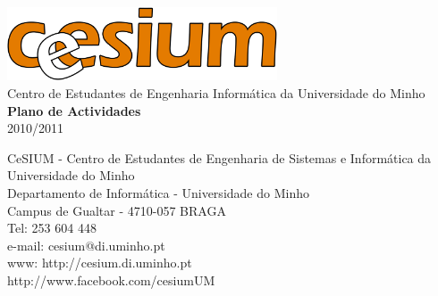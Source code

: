 \begin{titlepage}
	\begin{center}
		\vspace*{\fill}
		\includegraphics[width=0.6\textwidth]{files/cesiumLogoSolido}\\
		Centro de Estudantes de Engenharia Informática da Universidade do Minho\\

		\vspace{20pt}
		\Huge\textbf{Plano de Actividades}\\

		\vspace{15pt}
		\huge{2010/2011}
		\vspace*{\fill}
	\end{center}

	\begin{flushright}
		CeSIUM - Centro de Estudantes de Engenharia de Sistemas e Informática da Universidade do Minho\\
		Departamento de Informática - Universidade do Minho \\
		Campus de Gualtar - 4710-057 BRAGA \\
		Tel: 253 604 448 \\
		e-mail: cesium@di.uminho.pt \\
		www: http://cesium.di.uminho.pt \\
		http://www.facebook.com/cesiumUM\\
	\end{flushright}
\end{titlepage}
